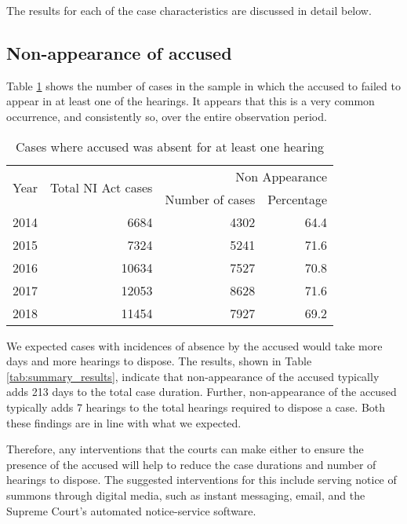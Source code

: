 The results for each of the case characteristics are discussed in detail below.

\subsection{Non-appearance of accused}
\label{sec:non-appe-accus-1}

Table \ref{tab:nonAppearance_yearWise} shows the number of cases in the sample in which the accused to failed to appear in at least one of the hearings. It appears that this is a very common occurrence, and consistently so, over the entire observation period.

\begin{longtable}[h!]{@{}lrrr@{}}
  \caption{Cases where accused was absent for at least one hearing}\label{tab:nonAppearance_yearWise}\\
\toprule
\multirow{2}{*}{Year} &  \multirow{2}{*}{Total NI Act cases} & \multicolumn{2}{p{4cm}}{Non Appearance}\\
\cmidrule{3-4}
&& Number of cases & Percentage \\
\midrule\endhead
2014 &   6684 &  4302 &  64.4 \\
2015 &   7324 &  5241 &  71.6 \\
2016 &  10634 &  7527 &  70.8 \\
2017 &  12053 &  8628 &  71.6 \\
2018 &  11454 &  7927 &  69.2 \\
\bottomrule
\end{longtable}

We expected cases with incidences of absence by the accused would take more days and more hearings to dispose. The results, shown in Table \ref{tab:summary_results}, indicate that non-appearance of the accused typically adds 213 days to the total case duration. Further, non-appearance of the accused typically adds 7 hearings to the total hearings required to dispose a case. Both these findings are in line with what we expected.

Therefore, any interventions that the courts can make either to ensure the presence of the accused will help to reduce the case durations and number of hearings to dispose. The suggested interventions for this include serving notice of summons through digital media, such as instant messaging, email, and the Supreme Court's automated notice-service software.

